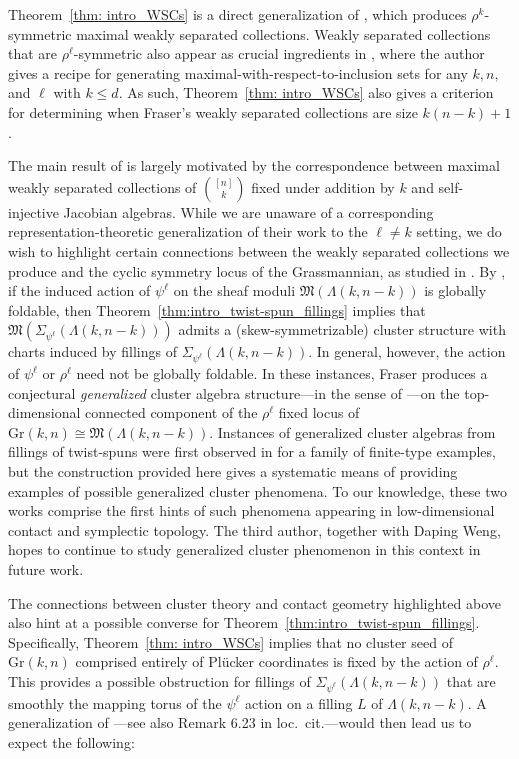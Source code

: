 \documentclass[11pt]{amsart}
\newcommand{\La}{\Lambda}
\newcommand{\Gr}{\text{Gr}}
\newcommand{\FM}{\mathfrak{M}}
\theoremstyle{plain}
\theoremstyle{definition}
\begin{document}
Theorem~\ref{thm: intro_WSCs} is a direct generalization of \cite[Theorem 1.6]{PasqTZ2019}, which produces $\rho^k$-symmetric maximal weakly separated collections. Weakly separated collections that are $\rho^\ell$-symmetric also appear as crucial ingredients in \cite{Fraser2020}, where the author gives a recipe for generating maximal-with-respect-to-inclusion sets for any $k, n,$ and $\ell$ with $k\leq d$. As such, Theorem~\ref{thm: intro_WSCs} also gives a criterion for determining when Fraser's weakly separated collections are size $k(n-k)+1$. 

The main result of \cite{PasqTZ2019} is largely motivated by the correspondence between maximal weakly separated collections of ${[n]\choose k}$ fixed under addition by $k$ and self-injective Jacobian algebras. While we are unaware of a corresponding representation-theoretic generalization of their work to the $\ell\neq k$ setting, we do wish to highlight certain connections between the weakly separated collections we produce and the cyclic symmetry locus of the Grassmannian, as studied in \cite{Fraser2020}. By \cite[Theorem 1.13]{HughesRoy}, if the induced action of $\psi^\ell$ on the sheaf moduli $\FM(\La(k, n-k))$ is globally foldable, then Theorem~\ref{thm:intro_twist-spun_fillings} implies that $\FM(\Sigma_{\psi^\ell}(\La(k, n-k)))$ admits a (skew-symmetrizable) cluster structure with charts induced by fillings of $\Sigma_{\psi^\ell}(\La(k, n-k))$. In general, however, the action of $\psi^\ell$ or $\rho^\ell$ need not be globally foldable. In these instances, Fraser produces a conjectural \emph{generalized} cluster algebra structure---in the sense of \cite{ChekhovShapiroGeneralizedCluster}---on the top-dimensional connected component of the $\rho^\ell$ fixed locus of $\Gr(k, n)\cong \FM(\La(k, n-k))$. Instances of generalized cluster algebras from fillings of twist-spuns were first observed in \cite{HughesRoy} for a family of finite-type examples, but the construction provided here gives a systematic means of providing examples of possible generalized cluster phenomena. To our knowledge, these two works comprise the first hints of such phenomena appearing in low-dimensional contact and symplectic topology. The third author, together with Daping Weng, hopes to continue to study generalized cluster phenomenon in this context in future work.

The connections between cluster theory and contact geometry highlighted above also hint at a possible converse for Theorem~\ref{thm:intro_twist-spun_fillings}. Specifically, Theorem~\ref{thm: intro_WSCs} implies that no cluster seed of $\Gr(k, n)$ comprised entirely of Pl\"ucker coordinates is fixed by the action of $\rho^\ell$. This provides a possible obstruction for fillings of $\Sigma_{\psi^\ell}(\La(k, n-k))$ that are smoothly the mapping torus of the $\psi^\ell$ action on a filling $L$ of $\La(k, n-k)$. A generalization of \cite[Conjecture 1.16]{Hughes2021}---see also Remark 6.23 in loc.\ cit.---would then lead us to expect the following:
\end{document}
